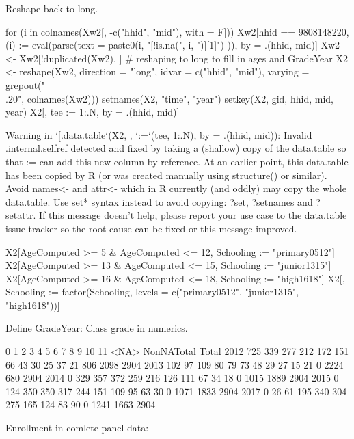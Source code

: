 Reshape back to long. \gobblepars
\begin{Schunk}
\begin{Sinput}
for (i in colnames(Xw2[, -c("hhid", "mid"), with = F]))
  Xw2[hhid == 9808148220, (i) := eval(parse(text = 
    paste0(i, "[!is.na(", i, ")][1]")
    )), by = .(hhid, mid)]
Xw2 <- Xw2[!duplicated(Xw2), ]
# reshaping to long to fill in ages and GradeYear
X2 <- reshape(Xw2, direction = "long", idvar = c("hhid", "mid"),
	varying = grepout("\\.20", colnames(Xw2)))
setnames(X2, "time", "year")
setkey(X2, gid, hhid, mid, year)
X2[, tee := 1:.N, by = .(hhid, mid)]
\end{Sinput}
\begin{Soutput}
Warning in `[.data.table`(X2, , `:=`(tee, 1:.N), by = .(hhid, mid)): Invalid .internal.selfref detected and fixed by taking a (shallow) copy of the data.table so that := can add this new column by reference. At an earlier point, this data.table has been copied by R (or was created manually using structure() or similar). Avoid names<- and attr<- which in R currently (and oddly) may copy the whole data.table. Use set* syntax instead to avoid copying: ?set, ?setnames and ?setattr. If this message doesn't help, please report your use case to the data.table issue tracker so the root cause can be fixed or this message improved.
\end{Soutput}
\begin{Sinput}
X2[AgeComputed >= 5 & AgeComputed <= 12, Schooling := "primary0512"]
X2[AgeComputed >= 13 & AgeComputed <= 15, Schooling := "junior1315"]
X2[AgeComputed >= 16 & AgeComputed <= 18, Schooling := "high1618"]
X2[, Schooling := factor(Schooling, levels = 
	c("primary0512", "junior1315", "high1618"))]
\end{Sinput}
\end{Schunk}
Define \textsf{GradeYear}: Class grade in numerics.
\begin{Schunk}
\begin{Soutput}
       0   1   2   3   4   5   6   7   8  9 10 11 <NA> NonNATotal Total
2012 725 339 277 212 172 151  66  43  30 25 37 21  806       2098  2904
2013 102  97 109  80  79  73  48  29  27 15 21  0 2224        680  2904
2014   0 329 357 372 259 216 126 111  67 34 18  0 1015       1889  2904
2015   0 124 350 350 317 244 151 109  95 63 30  0 1071       1833  2904
2017   0  26  61 195 340 304 275 165 124 83 90  0 1241       1663  2904
\end{Soutput}
\end{Schunk}
Enrollment in comlete panel data:
